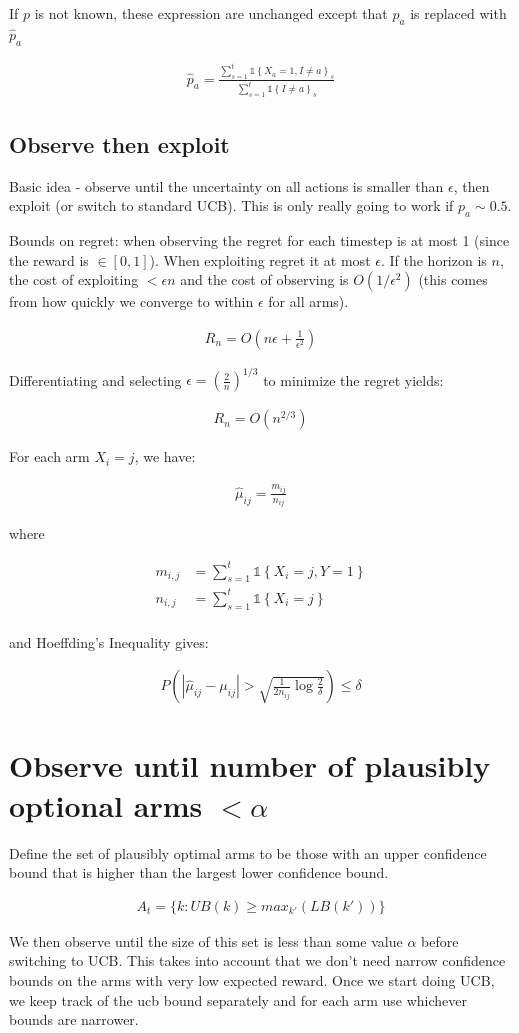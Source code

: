 \documentclass{article}
\newcommand{\set}[1]{\left\{#1\right\}}
\newcommand{\ind}[1]{\mathds{1}\!\!\set{#1}}
\newcommand{\eqn}[1]{\begin{align}#1\end{align}}
\newcommand{\eq}[1]{\begin{align*}#1\end{align*}}
\theoremstyle{plain}
\theoremstyle{definition}
\begin{document}
If $p$ is not known, these expression are unchanged except that $p_a$ is replaced with $\hat{p}_a$

\eq{
\hat{p}_a = \frac{\sum_{s=1}^{t} \ind{X_a=1,I \neq a}_s}{\sum_{s=1}^{t} \ind{I \neq a}_s}
}
\subsection{Observe then exploit}

Basic idea - observe until the uncertainty on all actions is smaller than $\epsilon$, then exploit (or switch to standard UCB). This is only really going to work if $p_a \sim 0.5$. 

Bounds on regret: when observing the regret for each timestep is at most 1 (since the reward is $\in [0,1]$). When exploiting regret it at most $\epsilon$. If the horizon is $n$, the cost of exploiting $< \epsilon n$ and the cost of observing is $O(1/\epsilon^2)$ (this comes from how quickly we converge to within $\epsilon$ for all arms). 

\eqn{
R_n = O(n\epsilon+\frac{1}{\epsilon^2})
}

Differentiating and selecting $\epsilon = (\frac{2}{n})^{1/3}$ to minimize the regret yields:

\eqn{
R_n = O(n^{2/3})
}

For each arm $X_i = j$, we have:

\eqn{
\hat{\mu}_{ij} = \frac{m_{ij}}{n_{ij}}
}

where

\eqn{
m_{i,j}    &= \sum_{s=1}^t \ind{X_i = j, Y = 1} \\
n_{i,j}    &= \sum_{s=1}^t \ind{X_i = j} \\
}

and Hoeffding's Inequality gives:

\eqn {
P\left(|\hat{\mu}_{ij} - \mu_{ij}| > \sqrt{\frac{1}{2n_{ij}}\log{\frac{2}{\delta}}}\right) \leq \delta
}

\section{Observe until number of plausibly optional arms $< \alpha$}

Define the set of plausibly optimal arms to be those with an upper confidence bound that is higher than the largest lower confidence bound.

\eqn {
A_t = \{k : UB(k) \geq max_{k'}(LB(k'))  \}
}

We then observe until the size of this set is less than some value $\alpha$ before switching to UCB. This takes into account that we don't need narrow confidence bounds on the arms with very low expected reward. Once we start doing UCB, we keep track of the ucb bound separately and for each arm use whichever bounds are narrower. 
\end{document}
